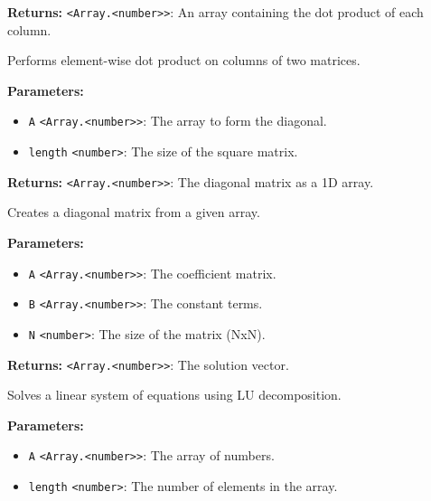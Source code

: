 \documentclass[12pt,a4paper]{article}
\begin{document}
\noindent \textbf{Returns:} \texttt{<Array.<number>>}: An array containing the dot product of each column.

\noindent Performs element-wise dot product on columns of two matrices.

\vspace{5mm}
\noindent {}


\noindent \textbf{Parameters:}
\begin{itemize}
  \item \texttt{A} \texttt{<Array.<number>>}: The array to form the diagonal.
  \item \texttt{length} \texttt{<number>}: The size of the square matrix.
\end{itemize}

\noindent \textbf{Returns:} \texttt{<Array.<number>>}: The diagonal matrix as a 1D array.

\noindent Creates a diagonal matrix from a given array.

\vspace{5mm}
\noindent {}


\noindent \textbf{Parameters:}
\begin{itemize}
  \item \texttt{A} \texttt{<Array.<number>>}: The coefficient matrix.
  \item \texttt{B} \texttt{<Array.<number>>}: The constant terms.
  \item \texttt{N} \texttt{<number>}: The size of the matrix (NxN).
\end{itemize}

\noindent \textbf{Returns:} \texttt{<Array.<number>>}: The solution vector.

\noindent Solves a linear system of equations using LU decomposition.

\vspace{5mm}
\noindent {}


\noindent \textbf{Parameters:}
\begin{itemize}
  \item \texttt{A} \texttt{<Array.<number>>}: The array of numbers.
  \item \texttt{length} \texttt{<number>}: The number of elements in the array.
\end{itemize}
\end{document}

